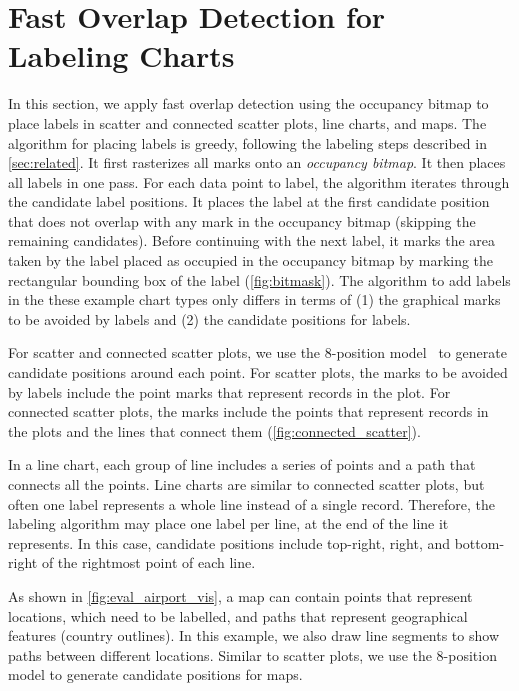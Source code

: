 \section{Fast Overlap Detection for Labeling Charts}

In this section, we apply fast overlap detection using the occupancy bitmap
to place labels in scatter and connected scatter plots, line charts, and maps.
The algorithm for placing labels is greedy, following the labeling steps described in \autoref{sec:related}.
It first rasterizes all marks onto an \emph{occupancy bitmap}.
It then places all labels in one pass. 
For each data point to label, the algorithm iterates through the candidate label positions.
It places the label at the first candidate position that does not overlap with any mark in the occupancy bitmap (skipping the remaining candidates).
Before continuing with the next label, it marks the area taken by the label placed as occupied in the occupancy bitmap 
by marking  the rectangular bounding box of the label (\autoref{fig:bitmask}).
The algorithm to add labels in the these example chart types only differs in terms of (1) the graphical marks to be avoided by labels and (2) the candidate positions for labels.

For scatter and connected scatter plots, we use the 8-position model~\cite{imhof1975positioning} to generate candidate positions around each point.
For scatter plots, the marks to be avoided by labels include the point marks that represent records in the plot.
For connected scatter plots, the marks include the points that represent records in the plots and the lines that connect them (\autoref{fig:connected_scatter}).

In a line chart, each group of line includes a series of points and a path that connects all the points.
Line charts are similar to connected scatter plots, but often one label represents a whole line instead of a single record.
Therefore, the labeling algorithm may place one label per line, at the end of the line it represents.
In this case, candidate positions include top-right, right, and bottom-right of the rightmost point of each line.

As shown in \autoref{fig:eval_airport_vis}, a map can contain points that represent locations, which need to be labelled, and paths that represent geographical features (\eg country outlines).
In this example, we also draw line segments to show paths between different locations.
Similar to scatter plots, we use the 8-position model to generate candidate positions for maps. 